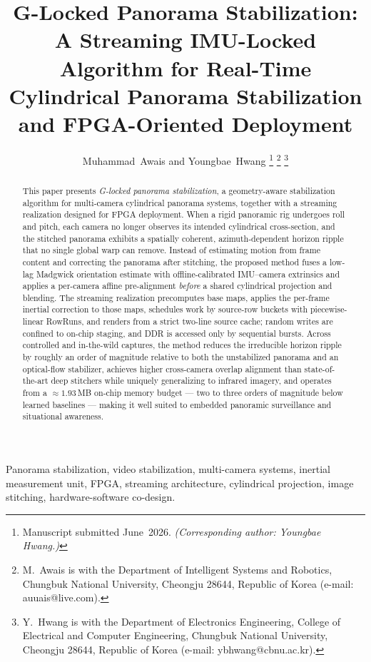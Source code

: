 \documentclass[journal]{IEEEtran}
\title{G-Locked Panorama Stabilization: A Streaming IMU-Locked Algorithm for Real-Time Cylindrical Panorama Stabilization and FPGA-Oriented Deployment}
\author{Muhammad~Awais and Youngbae~Hwang%
\thanks{Manuscript submitted June~2026. \textit{(Corresponding author: Youngbae Hwang.)}}%
\thanks{M.~Awais is with the Department of Intelligent Systems and Robotics, Chungbuk National University, Cheongju 28644, Republic of Korea (e-mail: auuais@live.com).}%
\thanks{Y.~Hwang is with the Department of Electronics Engineering, College of Electrical and Computer Engineering, Chungbuk National University, Cheongju 28644, Republic of Korea (e-mail: ybhwang@cbnu.ac.kr).}}
\begin{document}
\maketitle

\begin{abstract}
This paper presents \emph{G-locked panorama stabilization}, a geometry-aware stabilization algorithm for multi-camera cylindrical panorama systems, together with a streaming realization designed for FPGA deployment. When a rigid panoramic rig undergoes roll and pitch, each camera no longer observes its intended cylindrical cross-section, and the stitched panorama exhibits a spatially coherent, azimuth-dependent horizon ripple that no single global warp can remove. Instead of estimating motion from frame content and correcting the panorama after stitching, the proposed method fuses a low-lag Madgwick orientation estimate with offline-calibrated IMU--camera extrinsics and applies a per-camera affine pre-alignment \emph{before} a shared cylindrical projection and blending. The streaming realization precomputes base maps, applies the per-frame inertial correction to those maps, schedules work by source-row buckets with piecewise-linear RowRuns, and renders from a strict two-line source cache; random writes are confined to on-chip staging, and DDR is accessed only by sequential bursts. Across controlled and in-the-wild captures, the method reduces the irreducible horizon ripple by roughly an order of magnitude relative to both the unstabilized panorama and an optical-flow stabilizer, achieves higher cross-camera overlap alignment than state-of-the-art deep stitchers while uniquely generalizing to infrared imagery, and operates from a ${\approx}1.93$\,MB on-chip memory budget --- two to three orders of magnitude below learned baselines --- making it well suited to embedded panoramic surveillance and situational awareness.
\end{abstract}

\begin{IEEEkeywords}
Panorama stabilization, video stabilization, multi-camera systems, inertial measurement unit, FPGA, streaming architecture, cylindrical projection, image stitching, hardware-software co-design.
\end{IEEEkeywords}
\end{document}
